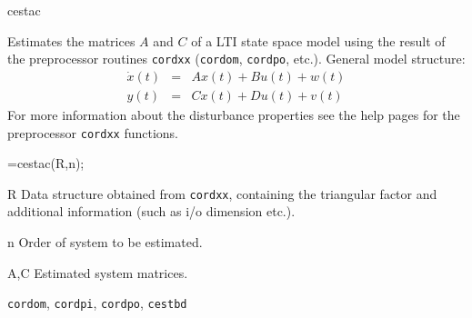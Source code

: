 \documentclass{book}
\newcommand{\cordxx}{\texttt{cordxx}}
\newcommand{\cordom}{\texttt{cordom}}
\newcommand{\cordpo}{\texttt{cordpo}}
\newcommand{\cordpi}{\texttt{cordpi}}
\newcommand{\cestbd}{\texttt{cestbd}}
\begin{document}
\begin{command}{cestac}
\begin{purpose}
  Estimates the matrices $A$ and $C$ of a LTI state space model using the
  result of the preprocessor routines {\cordxx} ({\cordom}, {\cordpo}, etc.).
  General model structure:
  \begin{eqnarray*}
    \dot{x}(t) &=&  A x(t) + B u(t) +w(t)\\
    y(t) &=& C x(t) + Du(t) + v(t)
  \end{eqnarray*}
  For more information about the disturbance properties see
  the help pages for the preprocessor {\cordxx} functions.
\end{purpose}
\begin{syntax}
  [A,C]=cestac(R,n);
\end{syntax}
\begin{inputs}
\item[R] Data structure obtained from {\cordxx}, containing the
  triangular factor and additional information (such as i/o dimension
  etc.).
\item[n] Order of system to be estimated.
\end{inputs}
\begin{outputs}
\item[A,C] Estimated system matrices.
\end{outputs}
\begin{seealso}
 {\cordom}, {\cordpi}, {\cordpo}, {\cestbd}
\end{seealso}
\end{command}%
 
\end{document}
